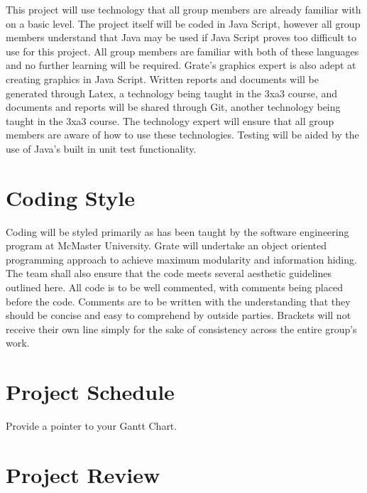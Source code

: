 \documentclass{article}
\begin{document}
This project will use technology that all group members are already familiar 
with on a basic level. The project itself will be coded in Java Script, however 
all group members understand that Java may be used if Java Script proves too 
difficult to use for this project. All group members are familiar with both of 
these languages and no further learning will be required. Grate’s graphics 
expert is also adept at creating graphics in Java Script. Written reports and 
documents will be generated through Latex, a technology being taught in the 3xa3 
course, and documents and reports will be shared through Git, another technology 
being taught in the 3xa3 course. The technology expert will ensure that all 
group members are aware of how to use these technologies. Testing will be aided 
by the use of Java’s built in unit test functionality.

\section{Coding Style}

Coding will be styled primarily as has been taught by the software engineering 
program at McMaster University. Grate will undertake an object oriented 
programming approach to achieve maximum modularity and information hiding. The 
team shall also ensure that the code meets several aesthetic guidelines outlined 
here. All code is to be well commented, with comments being placed before the 
code. Comments are to be written with the understanding that they should be 
concise and easy to comprehend by outside parties. Brackets will not receive 
their own line simply for the sake of consistency across the entire group’s 
work.

\section{Project Schedule}

Provide a pointer to your Gantt Chart.

\section{Project Review}
\end{document}
